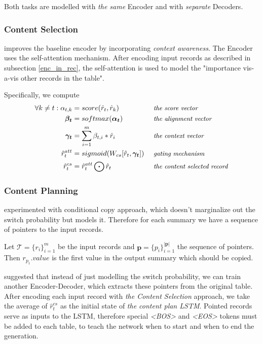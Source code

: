 Both tasks are modelled with \emph{the same} Encoder and with \emph{separate} Decoders.

\subsubsection{Content Selection}

\citep{puduppully2019datatotext} improves the baseline encoder by incorporating \emph{context awareness}. The Encoder uses the self-attention mechanism. After encoding input records as described in subsection \ref{enc_in_rec}, the self-attention is used to model the "importance vis-a-vis other records in the table".

Specifically, we compute
\begin{align*}
\forall k \neq t : \alpha_{t, k} &= score(\hat{r}_t, \hat{r}_k)                         &&\mbox{ \small \emph{the score vector}}\\
\boldsymbol{\beta_t}             &= softmax(\boldsymbol{\alpha_t})                      &&\mbox{ \small \emph{the alignment vector}}\\
\boldsymbol{\gamma_t}            &= \sum_{i=1}^m{\beta_{t, i} * \hat{r}_i}               &&\mbox{ \small \emph{the context vector}}\\
\hat{r}_t^{att}                  &= sigmoid( W_{cs} [\hat{r}_t, \boldsymbol{\gamma_t}] ) &&\mbox{ \small \emph{gating mechanism}}\\
\hat{r}_t^{cs}                   &= \hat{r}_t^{att} \bigodot \hat{r}_t                  &&\mbox{ \small \emph{the content selected record}}
\end{align*}

\subsubsection{Content Planning}

\citep{wiseman2017} experimented with conditional copy approach, which doesn't marginalize out the switch probability but models it. Therefore for each summary we have a sequence of pointers to the input records. 

Let $\mathcal{T} = \{r_i\}_{i=1}^m$ be the input records and $\mathbf{p} = \{p_i\}_{i=1}^{|\mathbf{p}|}$ the sequence of pointers. Then $r_{p_1}.value$ is the first value in the output summary which should be copied. 

\citep{puduppully2019datatotext} suggested that instead of just modelling the switch probability, we can train another Encoder-Decoder, which extracts these pointers from the original table. After encoding each input record with \emph{the Content Selection} approach, we take the average of $\hat{r}_t^{cs}$ as the initial state of \emph{the content plan LSTM}. Pointed records serve as inputs to the LSTM, therefore special \emph{\textless BOS\textgreater} and \emph{\textless EOS\textgreater} tokens must be added to each table, to teach the network when to start and when to end the generation.